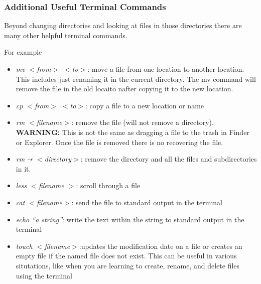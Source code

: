\documentclass[12pt]{article}
\begin{document}
\subsubsection{Additional Useful Terminal Commands}
Beyond changing directories and looking at files in those directories there are many other helpful terminal commands. 

For example
\begin{itemize}
\item \textit{mv $<$from$>$ $<$to$>$}: move a file from one location to another location. This includes just renaming it in the current directory. The mv command will remove the file in the old locaito nafter copying it to the new location.
\item \textit{cp $<$from$>$ $<$to$>$}: copy a file to a new location or name
\item \textit{rm $<$filename$>$}: remove the file (will not remove a directory). \textbf{WARNING:} This is not the same as dragging a file to the trash in Finder or Explorer. Once the file is removed there is no recovering the file.
\item \textit{rm -r $<$directory$>$}: remove the directory and all the files and subdirectories in it.
\item \textit{less $<$filename $>$}: scroll through a file
\item \textit{cat $<$filename$>$}: send the file to standard output in the terminal
\item \textit{echo ``a string''}: write the text within the string to standard output in the terminal 
  \item \textit{touch $<$filename$>$}:updates the modification date on a file or creates an empty file if the named file does not exist. This can be useful in various situtations, like when you are learning to create, rename, and delete files using the terminal
\end{itemize}
\end{document}
